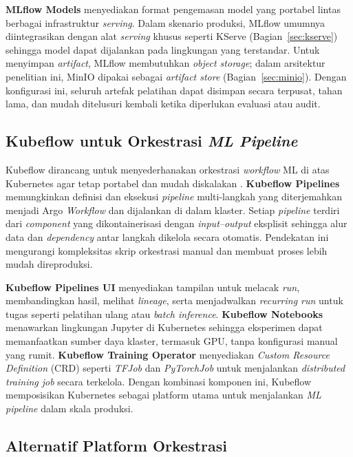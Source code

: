 \textbf{MLflow Models} menyediakan format pengemasan model yang portabel lintas berbagai infrastruktur \textit{serving}. Dalam skenario produksi, MLflow umumnya diintegrasikan dengan alat \textit{serving} khusus seperti KServe (Bagian~\ref{sec:kserve}) sehingga model dapat dijalankan pada lingkungan yang terstandar. Untuk menyimpan \textit{artifact}, MLflow membutuhkan \textit{object storage}; dalam arsitektur penelitian ini, MinIO dipakai sebagai \textit{artifact store} (Bagian~\ref{sec:minio}). Dengan konfigurasi ini, seluruh artefak pelatihan dapat disimpan secara terpusat, tahan lama, dan mudah ditelusuri kembali ketika diperlukan evaluasi atau audit.

\subsection{Kubeflow untuk Orkestrasi \textit{ML Pipeline}}
\label{sec:kubeflow}

Kubeflow dirancang untuk menyederhanakan orkestrasi \textit{workflow} ML di atas Kubernetes agar tetap portabel dan mudah diskalakan \autocite{kubeflow2024}. \textbf{Kubeflow Pipelines} memungkinkan definisi dan eksekusi \textit{pipeline} multi-langkah yang diterjemahkan menjadi Argo \textit{Workflow} dan dijalankan di dalam klaster. Setiap \textit{pipeline} terdiri dari \textit{component} yang dikontainerisasi dengan \textit{input--output} eksplisit sehingga alur data dan \textit{dependency} antar langkah dikelola secara otomatis. Pendekatan ini mengurangi kompleksitas skrip orkestrasi manual dan membuat proses lebih mudah direproduksi.

\textbf{Kubeflow Pipelines UI} menyediakan tampilan untuk melacak \textit{run}, membandingkan hasil, melihat \textit{lineage}, serta menjadwalkan \textit{recurring run} untuk tugas seperti pelatihan ulang atau \textit{batch inference}. \textbf{Kubeflow Notebooks} menawarkan lingkungan Jupyter di Kubernetes sehingga eksperimen dapat memanfaatkan sumber daya klaster, termasuk GPU, tanpa konfigurasi manual yang rumit. \textbf{Kubeflow Training Operator} menyediakan \textit{Custom Resource Definition} (CRD) seperti \textit{TFJob} dan \textit{PyTorchJob} untuk menjalankan \textit{distributed training job} secara terkelola. Dengan kombinasi komponen ini, Kubeflow memposisikan Kubernetes sebagai platform utama untuk menjalankan \textit{ML pipeline} dalam skala produksi.

\subsection{Alternatif Platform Orkestrasi}
\label{sec:orchestration_alternatives}

